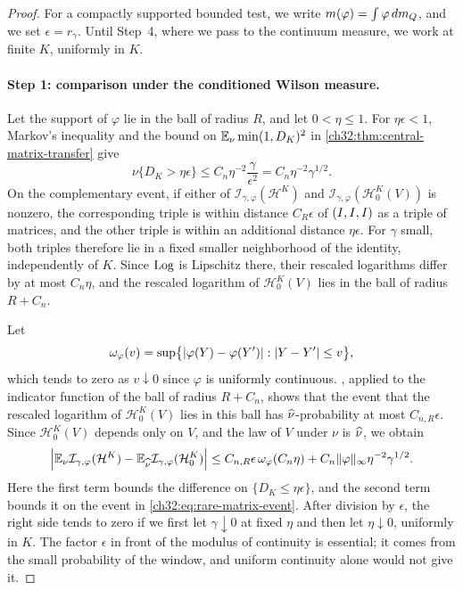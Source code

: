 \begin{proof}
For a compactly supported bounded test, we write $m(\varphi)=\int\varphi\,dm_Q$, and we set $\epsilon=r_\gamma$. Until Step~4, where we pass to the continuum measure, we work at finite $K$, uniformly in $K$.

\paragraph{Step 1: comparison under the conditioned Wilson measure.}
Let the support of $\varphi$ lie in the ball of radius $R$, and let $0<\eta\le1$. For $\eta\epsilon<1$, Markov's inequality and the bound on $\mathbb E_\nu\min(1,D_K)^2$ in \cref{ch32:thm:central-matrix-transfer} give
\begin{equation}\label{ch32:eq:rare-matrix-event}
 \nu\{D_K>\eta\epsilon\}\le C_n\eta^{-2}\frac\gamma{\epsilon^2}=C_n\eta^{-2}\gamma^{1/2}.
\end{equation}
On the complementary event, if either of $\mathcal I_{\gamma,\varphi}(\mathcal H^K)$ and $\mathcal I_{\gamma,\varphi}(\mathcal H^K_0(V))$ is nonzero, the corresponding triple is within distance $C_R\epsilon$ of $(I,I,I)$ as a triple of matrices, and the other triple is within an additional distance $\eta\epsilon$. For $\gamma$ small, both triples therefore lie in a fixed smaller neighborhood of the identity, independently of $K$. Since $\operatorname{Log}$ is Lipschitz there, their rescaled logarithms differ by at most $C_n\eta$, and the rescaled logarithm of $\mathcal H^K_0(V)$ lies in the ball of radius $R+C_n$.

Let
\[
 \omega_\varphi(v)=\sup\bigl\{\lvert \varphi(Y)-\varphi(Y')\rvert:\lvert Y-Y'\rvert\le v\bigr\},
\]
which tends to zero as $v\downarrow0$ since $\varphi$ is uniformly continuous. , applied to the indicator function of the ball of radius $R+C_n$, shows that the event that the rescaled logarithm of $\mathcal H^K_0(V)$ lies in this ball has $\widehat\nu$-probability at most $C_{n,R}\epsilon$. Since $\mathcal H^K_0(V)$ depends only on $V$, and the law of $V$ under $\nu$ is $\widehat\nu$, we obtain
\begin{equation}\label{ch32:eq:continuous-transfer}
 \Bigl\lvert\mathbb E_\nu\mathcal I_{\gamma,\varphi}(\mathcal H^K)-\mathbb E_{\widehat\nu}\mathcal I_{\gamma,\varphi}(\mathcal H^K_0)\Bigr\rvert\le C_{n,R}\epsilon\,\omega_\varphi(C_n\eta)+C_n\lVert \varphi\rVert_\infty\eta^{-2}\gamma^{1/2}.
\end{equation}
Here the first term bounds the difference on $\{D_K\le\eta\epsilon\}$, and the second term bounds it on the event in \eqref{ch32:eq:rare-matrix-event}. After division by $\epsilon$, the right side tends to zero if we first let $\gamma\downarrow0$ at fixed $\eta$ and then let $\eta\downarrow0$, uniformly in $K$. The factor $\epsilon$ in front of the modulus of continuity is essential; it comes from the small probability of the window, and uniform continuity alone would not give it.


\end{proof}
